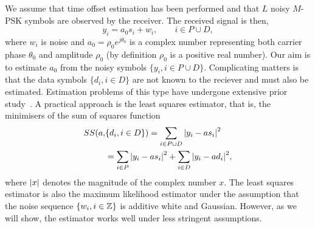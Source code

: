 \documentclass[journal]{IEEEtran}
\begin{document}
We assume that time offset estimation has been performed and that $L$ noisy $M$-PSK symbols are observed by the receiver.  The received signal is then,
\begin{equation}\label{eq:sigmod}
y_i = a_0 s_i + w_i, \qquad i \in P \cup D,
\end{equation}
where $w_i$ is noise and $a_0 = \rho_0 e^{j\theta_0}$ is a complex number representing both carrier phase $\theta_0$ and amplitude $\rho_0$ (by definition $\rho_0$ is a positive real number).  Our aim is to estimate $a_0$ from the noisy symbols $\{ y_i, i \in P \cup D \}$.  Complicating matters is that the data symbols $\{d_i, i \in D\}$ are not known to the reciever and must also be estimated.  Estimation problems of this type have undergone extensive prior study~\cite{ViterbiViterbi_phase_est_1983,Cowley_ref_sym_carr_1998,Wilson1989,Makrakis1990,Liu1991,Mackenthun1994,Sweldens2001,McKilliamLinearTimeBlockPSK2009,Divsalar1990}.  A practical approach is the least squares estimator, that is, the minimisers of the sum of squares function
\begin{equation}\label{eq:SSdefn}
\begin{split}
SS(a, &\{d_i, i \in D\}) = \sum_{i \in P \cup D} {\left\vert  y_i - a s_i  \right\vert}^2  \\
&= \sum_{i \in P} {\left\vert  y_i - a s_i  \right\vert}^2 + \sum_{i \in D} {\left\vert  y_i - a d_i  \right\vert}^2,
\end{split}
\end{equation}
where ${\left\vert x \right\vert}$ denotes the magnitude of the complex number $x$.  The least squares estimator is also the maximum likelihood estimator under the assumption that the noise sequence $\{w_i, i \in {\mathbb Z}\}$ is additive white and Gaussian.  However, as we will show, the estimator works well under less stringent assumptions.  %
\end{document}
